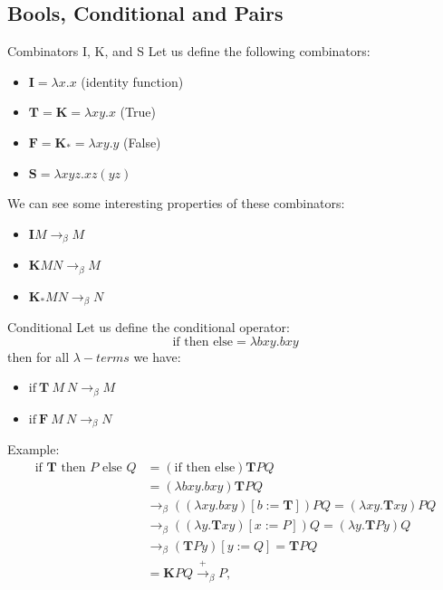 \documentclass{beamer}
\begin{document}
\subsection{Bools, Conditional and Pairs}
\begin{frame}{Combinators I, K, and S}
  Let us define the following combinators:
  \begin{itemize}
    \item \( \mathbf{I} = \lambda x.x \) (identity function)
    \item \(\mathbf{T} = \textbf{K} = \lambda xy.x \) (True)

    \item \( \mathbf{F} =\mathbf{K}_* = \lambda xy.y \) (False)
    \item \( \mathbf{S} = \lambda xyz. xz(yz) \) 
  \end{itemize}
  We can see some interesting properties of these combinators:
  \begin{itemize}
    \item \(\mathbf{I}M \rightarrow_\beta M\)
    \item \(\mathbf{K}MN \rightarrow_\beta M\)
    \item \(\mathbf{K}_*MN \rightarrow_\beta N\)
  \end{itemize}
\end{frame}




\begin{frame}{Conditional}
  Let us define the conditional operator:
  \[
    \text{if then else} = \lambda bxy. bxy
  \]
  then for all \(\lambda-terms\) we have:

  \begin{itemize}
    \item \(\text{if}\ \mathbf{T}\ M\ N \rightarrow_\beta M\)
    \item \(\text{if}\ \mathbf{F}\ M\ N \rightarrow_\beta N\)
  \end{itemize}
  Example:
  \[
  \begin{aligned}
      \text{if } \mathbf{T} \text{ then } P \text{ else } Q &= (\text{if then else}) \mathbf{T} P Q \\
      &= (\lambda bxy. bxy) \mathbf{T} P Q \\
      &\rightarrow_{\beta} ((\lambda xy. bxy)[b := \mathbf{T}]) P Q = (\lambda xy. \mathbf{T}xy) P Q \\
      &\rightarrow_{\beta} ((\lambda y. \mathbf{T}xy)[x := P]) Q = (\lambda y. \mathbf{T}Py) Q \\
      &\rightarrow_{\beta} (\mathbf{T}Py)[y := Q] = \mathbf{T} P Q \\
      &= \mathbf{K} P Q \xrightarrow{+}_{\beta} P,
  \end{aligned}
  \]
\end{frame}
\end{document}
